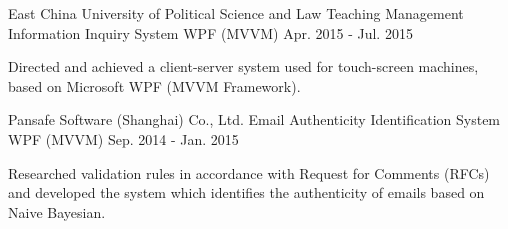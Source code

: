 \begin{cventries}
  \cventry
    {East China University of Political Science and Law}
    {Teaching Management Information Inquiry System}
    {WPF (MVVM)}
    {Apr. 2015 - Jul. 2015}
    {
      \begin{cvitems}
        \item {Directed and achieved a client-server system used for touch-screen machines, based on Microsoft WPF (MVVM Framework).}
      \end{cvitems}
    }
    
  \cventry
    {Pansafe Software (Shanghai) Co., Ltd.}
    {Email Authenticity Identification System}
    {WPF (MVVM)}
    {Sep. 2014 - Jan. 2015}
    {
      \begin{cvitems}
        \item {Researched validation rules in accordance with Request for Comments (RFCs) and developed the system which identifies the authenticity of emails based on Naive Bayesian.}
      \end{cvitems}
    }
\end{cventries}

